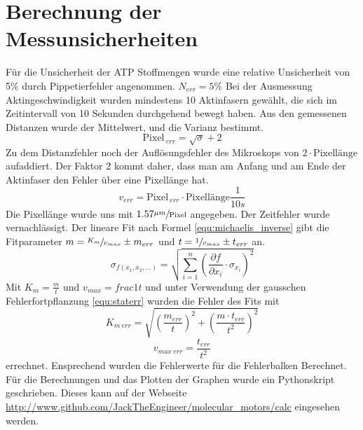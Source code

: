 \section{Berechnung der Messunsicherheiten}
Für die Unsicherheit der ATP Stoffmengen wurde eine relative Unsicherheit
von 5\% durch Pippetierfehler angenommen. $N_{err} = 5 \%$
Bei der Ausmessung Aktingeschwindigkeit wurden mindestens 10 Aktinfasern gewählt,
die sich im Zeitintervall von 10 Sekunden durchgehend bewegt haben.
Aus den gemessenen Distanzen wurde der Mittelwert, und die Varianz bestimmt.
\[
  \text{Pixel}_{\ err} = \sqrt{\sigma} + 2
\]
Zu dem Distanzfehler noch der Auflösungsfehler des Mikroskops
von $2 \cdot \text{Pixellänge}$ aufaddiert. Der Faktor 2 kommt daher,
dass man am Anfang und am Ende der Aktinfaser den Fehler über eine Pixellänge hat.
\[
  v_{err} = \text{Pixel}_{\ err} \cdot \text{Pixellänge} \frac{1}{10s}
\]
Die Pixellänge wurde uns mit $1.57\sfrac{\mu m}{\text{Pixel}}$ angegeben.
Der Zeitfehler wurde vernachlässigt.
Der lineare Fit nach Formel \ref{equ:michaelis_inverse} gibt die Fitparameter
$m = \sfrac{K_m}{v_{max}} \pm m_{err}$ und $t = \sfrac{1}{v_{max}} \pm t_{err}$ an.
\begin{equation}
	\sigma_{f(x_1,x_2,...)} = \sqrt{\sum\limits_{i=1}^n (\frac{\partial f}{\partial x_i} \cdot \sigma_{x_i})^2}
	\label{equ:staterr}
\end{equation}
Mit $K_m = \frac{m}{t}$ und $v_{max} = frac{1}{t}$ und unter Verwendung der
gausschen Fehlerfortpflanzung \ref{equ:staterr} wurden die
Fehler des Fits mit
\[
  K_{m\ err} = \sqrt{(\frac{m_{err}}{t})^2 + (\frac{m \cdot t_{err}}{t^2})^2}
\] 
\[
  v_{max\ err} = \frac{t_{err}}{t^2}
\]
errechnet.
Ensprechend wurden die Fehlerwerte für die Fehlerbalken Berechnet.
Für die Berechnungen und das Plotten der Graphen wurde ein Pythonskript geschrieben.
Dieses kann auf der Webseite \url{http://www.github.com/JackTheEngineer/molecular_motors/calc} eingesehen werden.

